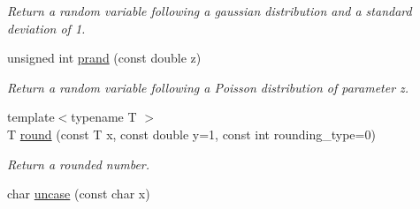 \begin{DoxyCompactItemize}
\begin{DoxyCompactList}\small\item\em Return a random variable following a gaussian distribution and a standard deviation of 1. \item\end{DoxyCompactList}\item 
\hypertarget{namespacecimg__library_1_1cimg_a7f927973e2bc17b851bb61cdfbfef061}{
unsigned int \hyperlink{namespacecimg__library_1_1cimg_a7f927973e2bc17b851bb61cdfbfef061}{prand} (const double z)}
\label{namespacecimg__library_1_1cimg_a7f927973e2bc17b851bb61cdfbfef061}

\begin{DoxyCompactList}\small\item\em Return a random variable following a Poisson distribution of parameter z. \item\end{DoxyCompactList}\item 
{\footnotesize template$<$typename T $>$ }\\T \hyperlink{namespacecimg__library_1_1cimg_a11dbf1e8cb2449f8c0b86a529673e3d8}{round} (const T x, const double y=1, const int rounding\_\-type=0)
\begin{DoxyCompactList}\small\item\em Return a rounded number. \item\end{DoxyCompactList}\item 
\hypertarget{namespacecimg__library_1_1cimg_a5a028d4d4de4e1894263a29a6de8e2ee}{
char \hyperlink{namespacecimg__library_1_1cimg_a5a028d4d4de4e1894263a29a6de8e2ee}{uncase} (const char x)}
\label{namespacecimg__library_1_1cimg_a5a028d4d4de4e1894263a29a6de8e2ee}


\end{DoxyCompactItemize}
